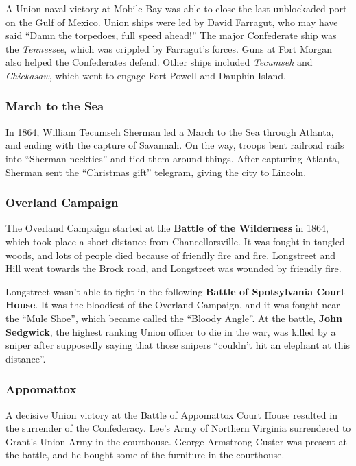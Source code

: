 A Union naval victory at Mobile Bay was able to close the last unblockaded port on the Gulf of Mexico.
Union ships were led by David Farragut, who may have said ``Damn the torpedoes, full speed ahead!''
The major Confederate ship was the \textit{Tennessee}, which was crippled by Farragut's forces.
Guns at Fort Morgan also helped the Confederates defend.
Other ships included \textit{Tecumseh} and \textit{Chickasaw},
which went to engage Fort Powell and Dauphin Island.

\subsubsection*{March to the Sea}

In 1864, William Tecumseh Sherman led a March to the Sea through Atlanta, and ending with the capture of Savannah.
On the way, troops bent railroad rails into ``Sherman neckties'' and tied them around things.
After capturing Atlanta, Sherman sent the ``Christmas gift'' telegram, giving the city to Lincoln.

\subsubsection*{Overland Campaign}

The Overland Campaign started at the \textbf{Battle of the Wilderness} in 1864,
which took place a short distance from Chancellorsville.
It was fought in tangled woods, and lots of people died because of friendly fire and fire.
Longstreet and Hill went towards the Brock road, and Longstreet was wounded by friendly fire.

Longstreet wasn't able to fight in the following \textbf{Battle of Spotsylvania Court House}.
It was the bloodiest of the Overland Campaign, and it was fought near the ``Mule Shoe'',
which became called the ``Bloody Angle''.
At the battle, \textbf{John Sedgwick}, the highest ranking Union officer to die in the war,
was killed by a sniper after supposedly saying that those snipers ``couldn't hit an elephant at this distance''.

\subsubsection*{Appomattox}

A decisive Union victory at the Battle of Appomattox Court House resulted in the surrender of the Confederacy.
Lee's Army of Northern Virginia surrendered to Grant's Union Army in the courthouse.
George Armstrong Custer was present at the battle, and he bought some of the furniture in the courthouse.

